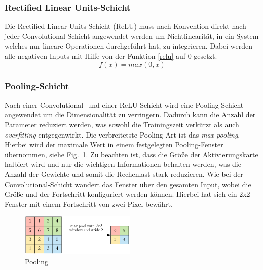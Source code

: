 \subsubsection{Rectified Linear Units-Schicht}
Die Rectified Linear Units-Schicht (ReLU) muss nach Konvention direkt nach jeder Convolutional-Schicht angewendet werden um Nichtlinearität, in ein System welches nur lineare Operationen durchgeführt hat, zu integrieren. Dabei werden alle negativen Inputs mit Hilfe von der Funktion \eqref{relu} auf 0 gesetzt.
\begin{equation}
f(x)=max(0,x)\label{relu}
\end{equation}

\subsubsection{Pooling-Schicht}
Nach einer Convolutional -und einer ReLU-Schicht wird eine Pooling-Schicht angewendet um die Dimensionalität zu verringern. Dadurch kann die Anzahl der Parameter reduziert werden, was sowohl die Trainingszeit verkürzt als auch \textit{overfitting} entgegenwirkt. Die verbreitetste Pooling-Art ist das \textit{max pooling}. Hierbei wird der maximale Wert in einem festgelegten Pooling-Fenster übernommen, siehe Fig.~\ref{fig-pooling}. Zu beachten ist, dass die Größe der Aktivierungskarte halbiert wird und nur die wichtigen Informationen behalten werden, was die Anzahl der Gewichte und somit die Rechenlast stark reduzieren. Wie bei der Convolutional-Schicht wandert das Fenster über den gesamten Input, wobei die Größe und der Fortschritt konfiguriert werden können. Hierbei hat sich ein 2x2 Fenster mit einem Fortschritt von zwei Pixel bewährt\cite{Dertat.2017}\cite{.11.05.2018}.
\begin{figure}[htbp]
\centerline{\includegraphics[height=2cm]{img/pooling.png}}
\caption{Pooling \cite{Dertat.2017}}
\label{fig-pooling}
\end{figure}

